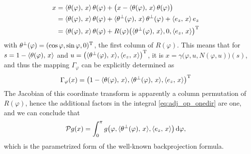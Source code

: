 \documentclass{amsart}
\renewcommand*{\phi}{\varphi}
\begin{document}
\begin{example}
\begin{align*}
  x 
  &= \INNER{\theta(\phi)}{x}\, \theta(\phi) + \big(x - \INNER{\theta(\phi)}{x}\, \theta(\phi)\big) \\
  &= \INNER{\theta(\phi)}{x}\, \theta(\phi) + \INNER{\theta^\perp(\phi)}{x}\, \theta^\perp(\phi) + \INNER{e_z}{x}\, e_z \\
  &= \INNER{\theta(\phi)}{x}\, \theta(\phi) + R(\phi) \TRANSP{\big(\INNER{\theta^\perp(\phi)}{x}, 0, \INNER{e_z}{x}\big)}
 \end{align*}
 with $\theta^\perp(\phi) = \TRANSP{(\cos\phi, \sin\phi, 0)}$, the first column of $R(\phi)$. This means that for 
 $s = 1 - \INNER{\theta(\phi)}{x}$ and $u = \TRANSP{\big(\INNER{\theta^\perp(\phi)}{x}, \INNER{e_z}{x}\big)}$, it is 
 $x = \gamma\big(\phi, u, N(\phi, u)\big)(s)$, and thus the mapping $\Gamma_\phi$ can be explicitly determined as
 \begin{equation*}
  \Gamma_\phi(x) = \TRANSP{\big(1 - \INNER{\theta(\phi)}{x}, \INNER{\theta^\perp(\phi)}{x}, \INNER{e_z}{x}\big)}
 \end{equation*}
 The Jacobian of this coordinate transform is apparently a column permutation of $R(\phi)$, hence the additional factors in the integral 
 \eqref{eq:adj_op_onedir} are one, and we can conclude that
 \begin{equation*}
  \OPP g(x) = \int_0^\pi g\big(\phi, \INNER{\theta^\perp(\phi)}{x}, \INNER{e_z}{x}\big)\, \D\phi,
 \end{equation*}
 which is the parametrized form of the well-known backprojection formula.
\end{example}
%
%
%
\end{document}

